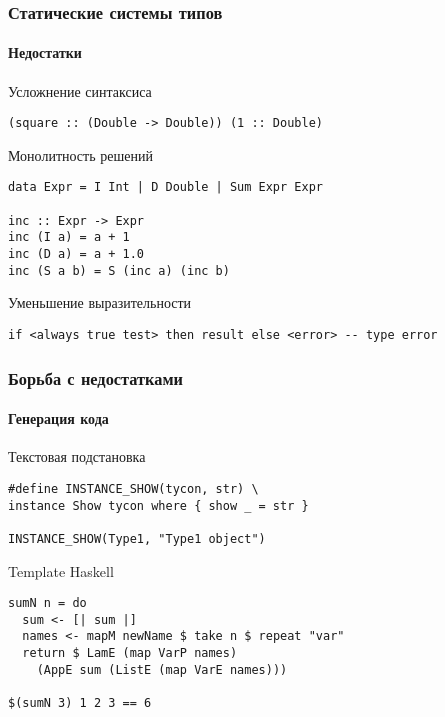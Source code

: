 \documentclass[ucs]{beamer}
\begin{document}

\begin{frame}[fragile]
  \frametitle{Статические системы типов}
  \framesubtitle{Недостатки}

  \begin{block}{Усложнение синтаксиса}
\begin{verbatim}
(square :: (Double -> Double)) (1 :: Double)
\end{verbatim}
  \end{block}

  \begin{block}{Монолитность решений}
\begin{verbatim}
data Expr = I Int | D Double | Sum Expr Expr

inc :: Expr -> Expr
inc (I a) = a + 1
inc (D a) = a + 1.0
inc (S a b) = S (inc a) (inc b)
\end{verbatim}
  \end{block}

  \begin{block}{Уменьшение выразительности}
\begin{verbatim}
if <always true test> then result else <error> -- type error
\end{verbatim}
  \end{block}
\end{frame}

\begin{frame}[fragile]
  \frametitle{Борьба с недостатками}
  \framesubtitle{Генерация кода}

  \begin{block}{Текстовая подстановка}
\begin{verbatim}
#define INSTANCE_SHOW(tycon, str) \
instance Show tycon where { show _ = str }

INSTANCE_SHOW(Type1, "Type1 object")
\end{verbatim}
  \end{block}

  \begin{block}{Template Haskell}
\begin{verbatim}
sumN n = do
  sum <- [| sum |]
  names <- mapM newName $ take n $ repeat "var"
  return $ LamE (map VarP names)
    (AppE sum (ListE (map VarE names)))

$(sumN 3) 1 2 3 == 6
\end{verbatim}
  \end{block}
\end{frame}
\end{document}
